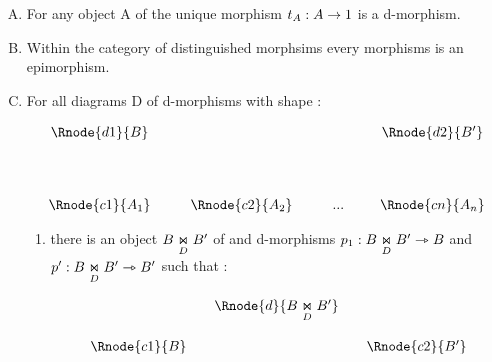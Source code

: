 \documentclass[10pt,a4paper]{scrartcl}
\begin{document}
\begin{enumerate} [A.,leftmargin=0.5cm]
	\item 
	  For any object A of  the unique morphism $t_A:A \morph 1$ is a d-morphism.
	\item 
	 Within the category of distinguished morphsims every morphisms is an epimorphism.
	\item
	For all diagrams D of d-morphisms with shape \ndidly:
	
\begin{center}
\begin{displaymath}
\begin{array}{cp{0.3cm}c         p{0.3cm}  c p{0.2cm} c}
\Rnode{d1}{B}& &               & &     & &\Rnode{d2}{B'}  \\ [1.4cm]
\Rnode{c1}{A_1}& &\Rnode{c2}{A_2}& & ... & &\Rnode{cn}{A_n}
\end{array}
\end{displaymath}
\end{center}

\begin{oldtt}
\begin{enumerate}[label*=\arabic*]
\item
{}
there is an object  $ \fibrex{B}{B'}{D}$ of  and d-morphisms 
$p_1: \fibrex{B}{B'}{D} \smorph B$ and  $p': \fibrex{B}{B'}{D} \smorph B'$ such that :

\begin{center}
\begin{displaymath}
\begin{array}{cp{0cm}cp{0cm} c}
            & &\Rnode{d}{\fibrex{B}{B'}{D}}                  \\ [0.6cm]
\Rnode{c1}{B}& &                & & \Rnode{c2}{B'} 
\end{array}
\end{displaymath}
\end{center}


\end{enumerate}
\end{oldtt}
\end{enumerate}
\end{document}
